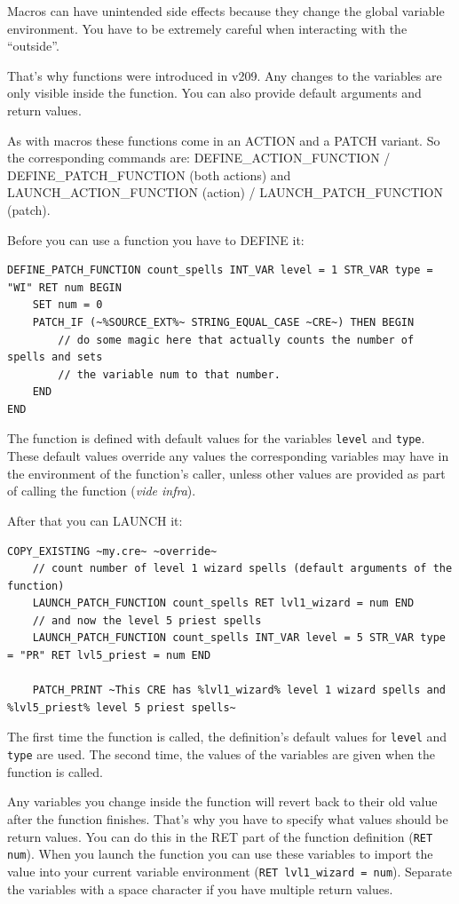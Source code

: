 \documentclass{article}
\begin{document}
Macros can have unintended side effects because they change the global variable environment.
You have to be extremely careful when interacting with the ``outside''.

That's why functions were introduced in v209. Any changes to the variables are only visible
inside the function. You can also provide default arguments and return values.

As with macros these functions come in an ACTION and a PATCH variant. So the corresponding
commands are: DEFINE_ACTION_FUNCTION / DEFINE_PATCH_FUNCTION (both actions) and
LAUNCH_ACTION_FUNCTION (action) / LAUNCH_PATCH_FUNCTION (patch).

Before you can use a function you have to DEFINE it:
\begin{verbatim}
DEFINE_PATCH_FUNCTION count_spells INT_VAR level = 1 STR_VAR type = "WI" RET num BEGIN
    SET num = 0
    PATCH_IF (~%SOURCE_EXT%~ STRING_EQUAL_CASE ~CRE~) THEN BEGIN
        // do some magic here that actually counts the number of spells and sets
        // the variable num to that number.
    END
END
\end{verbatim}

The function is defined with default values for the variables
\verb+level+ and \verb+type+. These default values override any values
the corresponding variables may have in the environment of the
function's caller, unless other values are provided as part of calling
the function (\textit{vide infra}).

After that you can LAUNCH it:
\begin{verbatim}
COPY_EXISTING ~my.cre~ ~override~
    // count number of level 1 wizard spells (default arguments of the function)
    LAUNCH_PATCH_FUNCTION count_spells RET lvl1_wizard = num END
    // and now the level 5 priest spells
    LAUNCH_PATCH_FUNCTION count_spells INT_VAR level = 5 STR_VAR type = "PR" RET lvl5_priest = num END

    PATCH_PRINT ~This CRE has %lvl1_wizard% level 1 wizard spells and %lvl5_priest% level 5 priest spells~
\end{verbatim}

The first time the function is called, the definition's default values
for \verb+level+ and \verb+type+ are used. The second time, the values
of the variables are given when the function is called.

Any variables you change inside the function will revert back to their old value
after the function finishes.
That's why you have to specify what values should be return values.
You can do this in the RET part of the function definition (\verb+RET num+).
When you launch the function you can use these variables to import the value
into your current variable environment (\verb+RET lvl1_wizard = num+).
Separate the variables with a space character if you have multiple return values.
\end{document}
